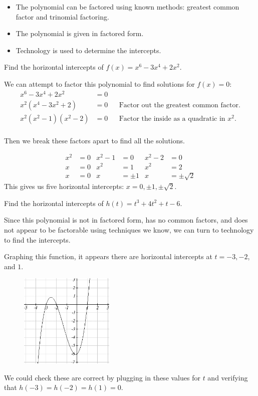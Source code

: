 \begin{itemize}
	\item The polynomial can be factored using known methods: greatest common factor and trinomial factoring.
	\item The polynomial is given in factored form.
	\item Technology is used to determine the intercepts.
\end{itemize}
\begin{example}
Find the horizontal intercepts of $f(x)=x^6-3x^4+2x^2$.

\begin{solution} We can attempt to factor this polynomial to find solutions for $f(x)=0$:
\begin{align*}
	x^6-3x^4+2x^2    &= 0& &\\
  x^2(x^4-3x^2+2)  &= 0& &\mbox{Factor out the greatest common factor.} \\
  x^2(x^2-1)(x^2-2)&= 0& &\mbox{Factor the inside as a quadratic in } x^2. \\
\end{align*}

Then we break these factors apart to find all the solutions.

\begin{align*}
    x^2 &= 0 & x^2-1 &= 0     & x^2-2 &= 0 \\
		x   &= 0 & x^2   &= 1     & x^2   &= 2 \\
    x   &= 0 & x     &= \pm 1 & x     &= \pm\sqrt{2}
\end{align*}
This gives us five horizontal intercepts: $x=0, \pm 1, \pm \sqrt{2}$.
\end{solution}\end{example}
\begin{example}
Find the horizontal intercepts of $h(t)=t^3+4t^2+t-6$.

\begin{solution} Since this polynomial is not in factored form, has no common factors, and does not appear to be factorable using techniques we know, we can turn to technology to find the intercepts.

Graphing this function, it appears there are horizontal intercepts at $t= -3, -2$, and $1$.

\begin{figure}[!ht]
\centering
\includegraphics[width=0.4\textwidth]{img/chap1/sec1-5/image067.png}
\caption{}
\end{figure}
We could check these are correct by plugging in these values for $t$ and verifying that $h(-3)=h(-2)=h(1)=0$.
\end{solution}\end{example}
